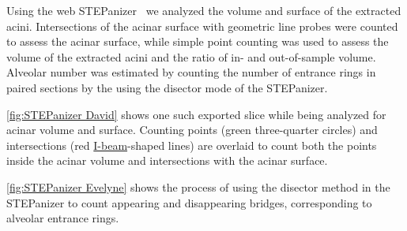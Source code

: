 \documentclass[twoside,paper=a4,abstract=true,english,DIV=calc]{scrartcl}
\begin{document}
Using the web STEPanizer~\cite[available free of charge at \url{http://stepanizer.com}]{Tschanz2011} we analyzed the volume and surface of the extracted acini.
Intersections of the acinar surface with geometric line probes were counted to assess the acinar surface, while simple point counting was used to assess the volume of the extracted acini and the ratio of in- and out-of-sample volume. Alveolar number was estimated by counting the number of entrance rings in paired sections by the using the disector mode of the STEPanizer.

\autoref{fig:STEPanizer David} shows one such exported slice while being analyzed for acinar volume and surface. 
Counting points (green three-quarter circles) and intersections (red \href{https://encrypted.google.com/search?q=i-beam&tbm=isch}{I-beam}-shaped lines) are overlaid to count both the points inside the acinar volume and intersections with the acinar surface.

\autoref{fig:STEPanizer Evelyne} shows the process of using the disector method in the STEPanizer to count appearing and disappearing bridges, corresponding to alveolar entrance rings.
\end{document}
